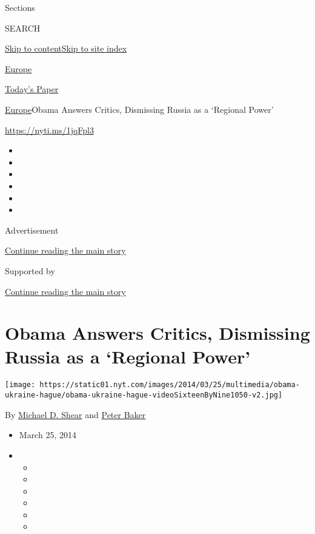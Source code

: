 Sections

SEARCH

\protect\hyperlink{site-content}{Skip to
content}\protect\hyperlink{site-index}{Skip to site index}

\href{https://www.nytimes.com/section/world/europe}{Europe}

\href{https://myaccount.nytimes.com/auth/login?response_type=cookie\&client_id=vi}{}

\href{https://www.nytimes.com/section/todayspaper}{Today's Paper}

\href{/section/world/europe}{Europe}\textbar{}Obama Answers Critics,
Dismissing Russia as a `Regional Power'

\url{https://nyti.ms/1jqFpl3}

\begin{itemize}
\item
\item
\item
\item
\item
\item
\end{itemize}

Advertisement

\protect\hyperlink{after-top}{Continue reading the main story}

Supported by

\protect\hyperlink{after-sponsor}{Continue reading the main story}

\hypertarget{obama-answers-critics-dismissing-russia-as-a-regional-power}{%
\section{Obama Answers Critics, Dismissing Russia as a `Regional
Power'}\label{obama-answers-critics-dismissing-russia-as-a-regional-power}}

\texttt{[image: https://static01.nyt.com/images/2014/03/25/multimedia/obama-ukraine-hague/obama-ukraine-hague-videoSixteenByNine1050-v2.jpg]}

By \href{http://www.nytimes.com/by/michael-d-shear}{Michael D. Shear}
and \href{http://www.nytimes.com/by/peter-baker}{Peter Baker}

\begin{itemize}
\item
  March 25, 2014
\item
  \begin{itemize}
  \item
  \item
  \item
  \item
  \item
  \item
  \end{itemize}
\end{itemize}

